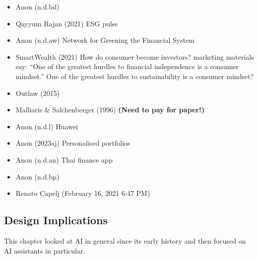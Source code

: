 \documentclass[
  letterpaper,
  DIV=11,
  numbers=noendperiod]{scrartcl}
\begin{document}
\begin{itemize}
\item
  Anon (n.d.bd)
\item
  Qayyum Rajan (2021) ESG pulse
\item
  Anon (n.d.aw) Network for Greening the Financial System
\item
  SmartWealth (2021) How do consumer become investors? marketing
  materials say: ``One of the greatest hurdles to financial independence
  is a consumer mindset.'' One of the greatest hurdles to sustainability
  is a consumer mindset?
\item
  Outlaw (2015)
\item
  Malliaris \& Salchenberger (1996) \textbf{(Need to pay for paper!)}
\item
  Anon (n.d.l) Huawei
\item
  Anon (2023aj) Personalised portfolios
\item
  Anon (n.d.an) Thai finance app
\item
  Anon (n.d.bp)
\item
  Renato Capelj (February 16, 2021 6:47 PM)
\end{itemize}

\subsection{Design Implications}\label{design-implications-3}

This chapter looked at AI in general since its early history and then
focused on AI assistants in particular.
\end{document}
